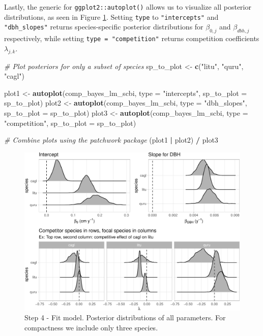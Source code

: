 \documentclass[12pt]{article}
\newenvironment{Shaded}{\begin{snugshade}}{\end{snugshade}}
\newcommand{\CommentTok}[1]{\textcolor[rgb]{0.56,0.35,0.01}{\textit{#1}}}
\newcommand{\DataTypeTok}[1]{\textcolor[rgb]{0.13,0.29,0.53}{#1}}
\newcommand{\KeywordTok}[1]{\textcolor[rgb]{0.13,0.29,0.53}{\textbf{#1}}}
\newcommand{\NormalTok}[1]{#1}
\newcommand{\OperatorTok}[1]{\textcolor[rgb]{0.81,0.36,0.00}{\textbf{#1}}}
\newcommand{\StringTok}[1]{\textcolor[rgb]{0.31,0.60,0.02}{#1}}
\begin{document}
Lastly, the generic for \texttt{ggplot2::autoplot()} allows us to
visualize all posterior distributions, as seen in Figure
\ref{fig:scbi-posterior-viz}. Setting \texttt{type} to
\texttt{"intercepts"} and \texttt{"dbh\_slopes"} returns
species-specific posterior distributions for \(\beta_{0,j}\) and
\(\beta_{dbh,j}\) respectively, while setting
\texttt{type\ =\ "competition"} returns competition coefficients
\(\lambda_{j,k}\).

\begin{Shaded}
\begin{Highlighting}[]
\CommentTok{# Plot posteriors for only a subset of species}
\NormalTok{sp_to_plot <-}\StringTok{ }\KeywordTok{c}\NormalTok{(}\StringTok{"litu"}\NormalTok{, }\StringTok{"quru"}\NormalTok{, }\StringTok{"cagl"}\NormalTok{)}

\NormalTok{plot1 <-}\StringTok{ }\KeywordTok{autoplot}\NormalTok{(comp_bayes_lm_scbi, }\DataTypeTok{type =} \StringTok{"intercepts"}\NormalTok{, }
                  \DataTypeTok{sp_to_plot =}\NormalTok{ sp_to_plot)}
\NormalTok{plot2 <-}\StringTok{ }\KeywordTok{autoplot}\NormalTok{(comp_bayes_lm_scbi, }\DataTypeTok{type =} \StringTok{"dbh_slopes"}\NormalTok{, }
                  \DataTypeTok{sp_to_plot =}\NormalTok{ sp_to_plot)}
\NormalTok{plot3 <-}\StringTok{ }\KeywordTok{autoplot}\NormalTok{(comp_bayes_lm_scbi, }\DataTypeTok{type =} \StringTok{"competition"}\NormalTok{, }
                  \DataTypeTok{sp_to_plot =}\NormalTok{ sp_to_plot)}

\CommentTok{# Combine plots using the patchwork package}
\NormalTok{(plot1 }\OperatorTok{|}\StringTok{ }\NormalTok{plot2) }\OperatorTok{/}\StringTok{ }\NormalTok{plot3}
\end{Highlighting}
\end{Shaded}

\begin{figure}

{\centering \includegraphics[width=1\linewidth]{Figures/scbi-posterior-viz-1} 

}

\caption{Step 4 - Fit model. Posterior distributions of all parameters. For compactness we include only three species.}\label{fig:scbi-posterior-viz}
\end{figure}
\end{document}
